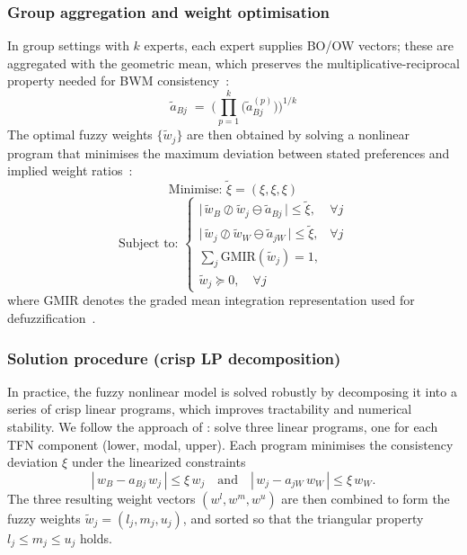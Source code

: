 \documentclass[preprint,12pt]{elsarticle}
\begin{document}
\subsubsection{Group aggregation and weight optimisation}
In group settings with $k$ experts, each expert supplies BO/OW vectors; these are aggregated with the geometric mean, which preserves the multiplicative-reciprocal property needed for BWM consistency~\citep{wanmohd_abdullah_2016_supplier_selection}:
\[
\tilde{a}_{Bj} \;=\; \Bigg(\prod_{p=1}^{k} \big(\tilde{a}_{Bj}^{(p)}\big)\Bigg)^{1/k}
\]
The optimal fuzzy weights $\{\tilde{w}_j\}$ are then obtained by solving a nonlinear program that minimises the maximum deviation between stated preferences and implied weight ratios~\citep{rezaei_2019_nonlinear_bwm,petrovic_etal_2022_axioms_efqm_fbwm_fmoora}:
\[
\text{Minimise: } \tilde{\xi}=(\xi,\xi,\xi)
\]
\[
\text{Subject to: } 
\begin{cases}
\big|\, \tilde{w}_B \oslash \tilde{w}_j \ominus \tilde{a}_{Bj} \,\big| \le \tilde{\xi}, & \forall j \\
\big|\, \tilde{w}_j \oslash \tilde{w}_W \ominus \tilde{a}_{jW} \,\big| \le \tilde{\xi}, & \forall j \\
\sum_{j} \mathrm{GMIR}(\tilde{w}_j) = 1, \\
\tilde{w}_j \succeq 0, \quad \forall j
\end{cases}
\]
where GMIR denotes the graded mean integration representation used for defuzzification~\citep{li_etal_2021_sc_fintech,petrovic_etal_2022_axioms_efqm_fbwm_fmoora}.

\subsubsection{Solution procedure (crisp LP decomposition)}
In practice, the fuzzy nonlinear model is solved robustly by decomposing it into a series of crisp linear programs, which improves tractability and numerical stability. We follow the approach of \citet{guo_zhao_2017_fbwm}: solve three linear programs, one for each TFN component (lower, modal, upper). Each program minimises the consistency deviation $\xi$ under the linearized constraints
\[
|\, w_B - a_{Bj}\, w_j \,| \le \xi\, w_j 
\quad \text{and} \quad
|\, w_j - a_{jW}\, w_W \,| \le \xi\, w_W.
\]
The three resulting weight vectors $(w^l,w^m,w^u)$ are then combined to form the fuzzy weights $\tilde{w}_j=(l_j,m_j,u_j)$, and sorted so that the triangular property $l_j \le m_j \le u_j$ holds.
\end{document}
